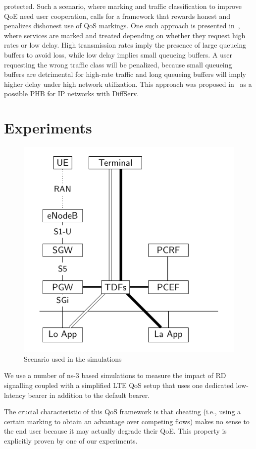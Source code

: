 \documentclass[12pt]{article}
\begin{document}
protected. Such a scenario, where marking and traffic classification to improve
QoE need user cooperation, calls for a framework that rewards honest and
penalizes dishonest use of QoS markings. One such approach is presented
in~\cite{PodlesnyG08}, where services are marked and treated depending on
whether they request high rates or low delay. High transmission rates imply the
presence of large queueing buffers to avoid loss, while low delay implies small
queueing buffers. A user requesting the wrong traffic class will be penalized,
because small queueing buffers are detrimental for high-rate traffic and long
queueing buffers will imply higher delay under high network utilization. This
approach was proposed in~\cite{you-tsvwg-latency-loss-tradeoff-00} as a
possible PHB for IP networks with DiffServ.

\section{Experiments}
\label{S:3}

\begin{figure}[t]
  \centering
  \includegraphics[width=.7\textwidth]{images/scenario2}
  \caption{\label{fig:scenario2}Scenario used in the simulations}
\end{figure}

We use a number of ns-3 based simulations to measure the impact of
RD signalling coupled with a simplified LTE QoS setup that
uses one dedicated low-latency bearer in addition to the default bearer.

The crucial characteristic of this QoS framework is that cheating (i.e.,
using a certain marking to obtain an advantage over competing flows)
makes no sense to the end user because it may actually degrade their QoE.
This property is explicitly proven by one of our experiments.
\end{document}
